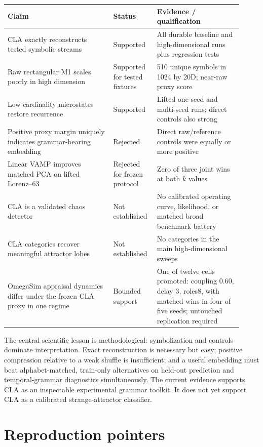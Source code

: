 \documentclass[11pt]{article}
\begin{document}
\begin{longtable}{p{0.42\linewidth}p{0.16\linewidth}p{0.34\linewidth}}
\toprule
Claim & Status & Evidence / qualification \\
\midrule
\endhead
CLA exactly reconstructs tested symbolic streams & Supported & All durable
baseline and high-dimensional runs plus regression tests \\
Raw rectangular M1 scales poorly in high dimension & Supported for tested
fixtures & 510 unique symbols in 1024 by 20D; near-raw proxy score \\
Low-cardinality microstates restore recurrence & Supported & Lifted one-seed
and multi-seed runs; direct controls also strong \\
Positive proxy margin uniquely indicates grammar-bearing embedding & Rejected &
Direct raw/reference controls were equally or more positive \\
Linear VAMP improves matched PCA on lifted Lorenz--63 & Rejected for frozen
protocol & Zero of three joint wins at both $k$ values \\
CLA is a validated chaos detector & Not established & No calibrated operating
curve, likelihood, or matched broad benchmark battery \\
CLA categories recover meaningful attractor lobes & Not established & No
categories in the main high-dimensional sweeps \\
OmegaSim appraisal dynamics differ under the frozen CLA proxy in one regime &
Bounded support & One of twelve cells promoted: coupling 0.60, delay 3, roles8,
with matched wins in four of five seeds; untouched replication required \\
\bottomrule
\end{longtable}

The central scientific lesson is methodological: symbolization and controls
dominate interpretation. Exact reconstruction is necessary but easy; positive
compression relative to a weak shuffle is insufficient; and a useful embedding
must beat alphabet-matched, train-only alternatives on held-out prediction and
temporal-grammar diagnostics simultaneously. The current evidence supports CLA
as an inspectable experimental grammar toolkit. It does not yet support CLA as
a calibrated strange-attractor classifier.

\section*{Reproduction pointers}
\end{document}
